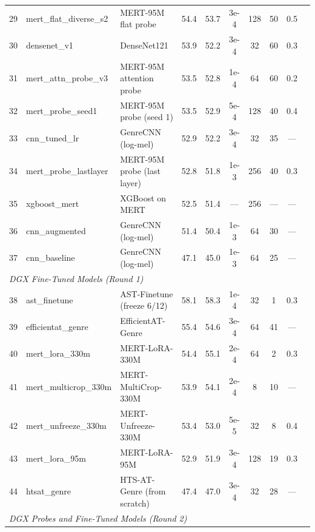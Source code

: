 \documentclass[conference]{IEEEtran}
\begin{document}
\begin{table}[t]
\begin{tabular}{rllccccccl}
29 & mert\_flat\_diverse\_s2 & MERT-95M flat probe & 54.4 & 53.7 & 3e-4 & 128 & 50 & 0.5 & \cite{li2023mert} \\
30 & densenet\_v1 & DenseNet121 & 53.9 & 52.2 & 3e-4 & 32 & 60 & 0.3 & \cite{huang2017densenet} \\
31 & mert\_attn\_probe\_v3 & MERT-95M attention probe & 53.5 & 52.8 & 1e-4 & 64 & 60 & 0.2 & \cite{safari2020self} \\
32 & mert\_probe\_seed1 & MERT-95M probe (seed 1) & 53.5 & 52.9 & 5e-4 & 128 & 40 & 0.4 & \cite{pasad2021layer} \\
33 & cnn\_tuned\_lr & GenreCNN (log-mel) & 52.9 & 52.2 & 3e-4 & 32 & 35 & --- & \cite{choi2017transfer} \\
34 & mert\_probe\_lastlayer & MERT-95M probe (last layer) & 52.8 & 51.8 & 1e-3 & 256 & 40 & 0.3 & \cite{pasad2021layer} \\
35 & xgboost\_mert & XGBoost on MERT & 52.5 & 51.4 & --- & 256 & --- & --- & \cite{chen2016xgboost} \\
36 & cnn\_augmented & GenreCNN (log-mel) & 51.4 & 50.4 & 1e-3 & 64 & 30 & --- & \cite{choi2017transfer} \\
37 & cnn\_baseline & GenreCNN (log-mel) & 47.1 & 45.0 & 1e-3 & 64 & 25 & --- & \cite{choi2017transfer} \\
\midrule
\multicolumn{10}{l}{\textit{DGX Fine-Tuned Models (Round 1)}} \\
\midrule
38 & ast\_finetune & AST-Finetune (freeze 6/12) & 58.1 & 58.3 & 1e-4 & 32 & 1 & 0.3 & \cite{gong2021ast} \\
39 & efficientat\_genre & EfficientAT-Genre & 55.4 & 54.6 & 3e-4 & 64 & 41 & --- & \cite{schmid2023efficientat} \\
40 & mert\_lora\_330m & MERT-LoRA-330M & 54.4 & 55.1 & 2e-4 & 64 & 2 & 0.3 & \cite{li2023mert,hu2021lora} \\
41 & mert\_multicrop\_330m & MERT-MultiCrop-330M & 53.9 & 54.1 & 2e-4 & 8 & 10 & --- & \cite{li2023mert} \\
42 & mert\_unfreeze\_330m & MERT-Unfreeze-330M & 53.4 & 53.0 & 5e-5 & 32 & 8 & 0.4 & \cite{li2023mert} \\
43 & mert\_lora\_95m & MERT-LoRA-95M & 52.9 & 51.9 & 3e-4 & 128 & 19 & 0.3 & \cite{li2023mert,hu2021lora} \\
44 & htsat\_genre & HTS-AT-Genre (from scratch) & 47.4 & 47.0 & 3e-4 & 32 & 28 & --- & \cite{chen2022htsat} \\
\midrule
\multicolumn{10}{l}{\textit{DGX Probes and Fine-Tuned Models (Round 2)}} \\

\end{tabular}
\end{table}
\end{document}
